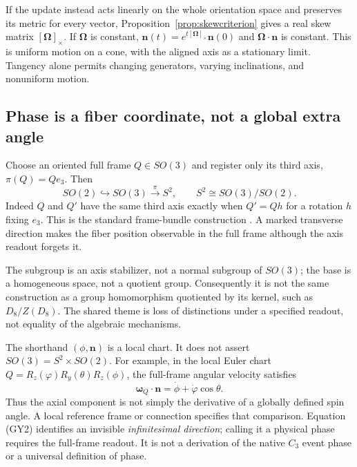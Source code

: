 If the update instead acts linearly on the whole orientation space and preserves its metric for every vector, Proposition~\ref{prop:skewcriterion} gives a real skew matrix $[\boldsymbol\Omega]_\times$. If $\boldsymbol\Omega$ is constant, $\mathbf n(t)=e^{t[\boldsymbol\Omega]_\times}\mathbf n(0)$ and $\boldsymbol\Omega\cdot\mathbf n$ is constant. This is uniform motion on a cone, with the aligned axis as a stationary limit. Tangency alone permits changing generators, varying inclinations, and nonuniform motion.

\subsection{Phase is a fiber coordinate, not a global extra angle}
Choose an oriented full frame $Q\in SO(3)$ and register only its third axis, $\pi(Q)=Qe_3$. Then
\begin{equation}
SO(2)\hookrightarrow SO(3)\xrightarrow{\ \pi\ }S^2,
\qquad S^2\cong SO(3)/SO(2).
\tag{GY3}\label{eq:rotorbundle}
\end{equation}
Indeed $Q$ and $Q'$ have the same third axis exactly when $Q'=Qh$ for a rotation $h$ fixing $e_3$. This is the standard frame-bundle construction \citep[Ch.~2, Exercises 56 and 69]{crainicbundles}. A marked transverse direction makes the fiber position observable in the full frame although the axis readout forgets it.

The subgroup is an axis stabilizer, not a normal subgroup of $SO(3)$; the base is a homogeneous space, not a quotient group. Consequently it is not the same construction as a group homomorphism quotiented by its kernel, such as $D_8/Z(D_8)$. The shared theme is loss of distinctions under a specified readout, not equality of the algebraic mechanisms.

The shorthand $(\phi,\mathbf n)$ is a local chart. It does not assert $SO(3)=S^2\times SO(2)$. For example, in the local Euler chart $Q=R_z(\varphi)R_y(\theta)R_z(\phi)$, the full-frame angular velocity satisfies
\begin{equation}
\boldsymbol\omega_Q\cdot\mathbf n
=\dot\phi+\dot\varphi\cos\theta.
\tag{GY4}\label{eq:phaseconnection}
\end{equation}
Thus the axial component is not simply the derivative of a globally defined spin angle. A local reference frame or connection specifies that comparison. Equation (GY2) identifies an invisible \emph{infinitesimal direction}; calling it a physical phase requires the full-frame readout. It is not a derivation of the native $C_3$ event phase or a universal definition of phase.

